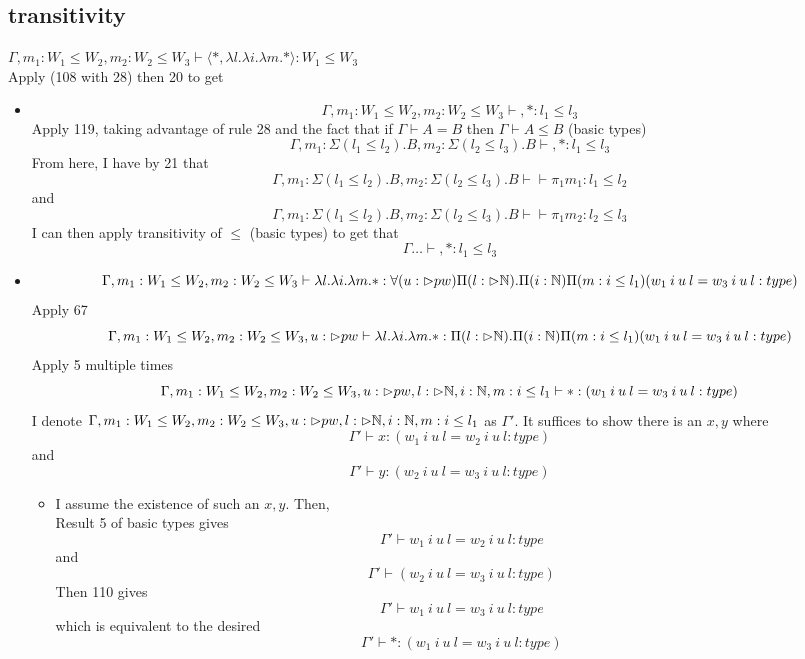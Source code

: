 \message{ !name(paper.tex)}\documentclass{article}
\begin{document}
\subsection{transitivity}
$\Gamma, m_1: W_1 \leq W_2, m_2 : W_2 \leq W_3 \vdash \langle *,
\lambda l. \lambda i. \lambda m. * \rangle
: W_1 \leq W_3$\\
Apply (108 with 28) then 20 to get
\begin{itemize}
    \item \[\Gamma, m_1: W_1 \leq W_2, m_2 : W_2 \leq W_3 \vdash, *: l_1 \leq l_3\]
    Apply 119, taking advantage of rule 28 and the fact that if $\Gamma \vdash A = B$ then $\Gamma \vdash A \leq B$ (basic types)
    \[\Gamma, m_1: \Sigma(l_1 \leq l_2).B, m_2 :\Sigma(l_2 \leq l_3).B \vdash, *: l_1 \leq l_3\]
    From here, I have by 21 that 
    \[\Gamma, m_1: \Sigma(l_1 \leq l_2).B, m_2 :\Sigma(l_2 \leq l_3).B \vdash \vdash \pi_1 m_1 : l_1 \leq l_2\] and  \[\Gamma, m_1: \Sigma(l_1 \leq l_2).B, m_2 :\Sigma(l_2 \leq l_3).B \vdash \vdash \pi_1 m_2 : l_2 \leq l_3\]
    I can then apply transitivity of $\leq$ (basic types) to get that 
     \[\Gamma \dots \vdash, *: l_1 \leq l_3\]
    \item \[\Gamma, m_1: W_1 \leq W_2, m_2 : W_2 \leq W_3 \vdash \lambda l. \lambda i. \lambda m. *: \forall(u: \rhd pw)\Pi(l: \rhd \mathbb{N}).\Pi(i: \mathbb{N})\Pi(m: i \leq l_1)(w_1 \: i \: u \: l = w_3 \: i \: u \: l : type)\]
    Apply 67
    \[\Gamma, m_1: W_1 \leq W_2, m_2 : W_2 \leq W_3, u: \rhd pw \vdash \lambda l. \lambda i. \lambda m. *: \Pi(l: \rhd \mathbb{N}).\Pi(i: \mathbb{N})\Pi(m: i \leq l_1)(w_1 \: i \: u \: l = w_3 \: i \: u \: l : type)\]
    Apply 5 multiple times
        \[\Gamma, m_1: W_1 \leq W_2, m_2 : W_2 \leq W_3, u: \rhd pw, l : \rhd \mathbb{N}, i: \mathbb{N}, m: i \leq l_1 \vdash *: (w_1 \: i \: u \: l = w_3 \: i \: u \: l : type)\]
        I denote $\Gamma, m_1: W_1 \leq W_2, m_2 : W_2 \leq W_3, u: \rhd pw, l : \rhd \mathbb{N}, i: \mathbb{N}, m: i \leq l_1$ as $\Gamma'$. 
    It suffices to show there is an $x, y$ where
    \[\Gamma' \vdash x : (w_1 \: i \: u \: l = w_2 \: i \: u \: l : type) \]
    and
    \[\Gamma' \vdash y : (w_2 \: i \: u \: l = w_3 \: i \: u \: l : type) \]
    \begin{itemize}
        \item I assume the existence of such an $x, y$. Then,\\
    Result 5 of basic types gives
     \[\Gamma' \vdash w_1 \: i \: u \: l = w_2 \: i \: u \: l : type \] and
       \[\Gamma' \vdash (w_2 \: i \: u \: l = w_3 \: i \: u \: l : type) \]
       Then 110 gives
        \[\Gamma' \vdash w_1 \: i \: u \: l = w_3 \: i \: u \: l : type \]
       which is equivalent to the desired
         \[\Gamma' \vdash *: (w_1 \: i \: u \: l = w_3 \: i \: u \: l : type) \]
         

\end{itemize}
\end{itemize}
\end{document}
